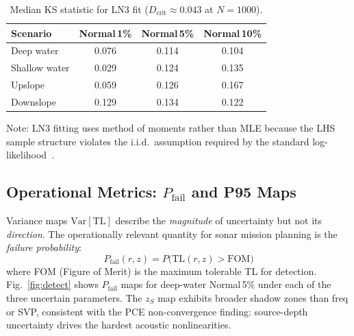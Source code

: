 \documentclass[journal,10pt,twoside]{IEEEtran}
\newcommand{\Var}{\mathrm{Var}}
\newcommand{\TL}{\mathrm{TL}}
\begin{document}
\begin{table}[H]
  \centering
  \caption{Median KS statistic for LN3 fit ($D_\mathrm{crit} \approx 0.043$ at $N{=}1000$).}
  \label{tab:ks}
  \begin{tabular}{lccc}
    \toprule
    Scenario     & Normal\,1\% & Normal\,5\% & Normal\,10\% \\
    \midrule
    Deep water   & 0.076       & 0.114       & 0.104        \\
    Shallow water& 0.029       & 0.124       & 0.135        \\
    Upslope      & 0.059       & 0.126       & 0.167        \\
    Downslope    & 0.129       & 0.134       & 0.122        \\
    \bottomrule
  \end{tabular}
\end{table}

Note: LN3 fitting uses method of moments rather than MLE because the LHS
sample structure violates the i.i.d.\ assumption required by the standard
log-likelihood~\cite{iman2008}.

\subsection{Operational Metrics: $P_\mathrm{fail}$ and P95 Maps}

Variance maps $\Var[\TL]$ describe the \emph{magnitude} of uncertainty but not
its \emph{direction}.
The operationally relevant quantity for sonar mission planning is the
\emph{failure probability}:
\begin{equation}
  P_\mathrm{fail}(r,z) = P\bigl(\TL(r,z) > \mathrm{FOM}\bigr)
\end{equation}
where FOM (Figure of Merit) is the maximum tolerable TL for detection.
Fig.~\ref{fig:detect} shows $P_\mathrm{fail}$ maps for deep-water Normal\,5\%
under each of the three uncertain parameters.
The $z_S$ map exhibits broader shadow zones than freq or SVP, consistent with
the PCE non-convergence finding: source-depth uncertainty drives the hardest
acoustic nonlinearities.
\end{document}
